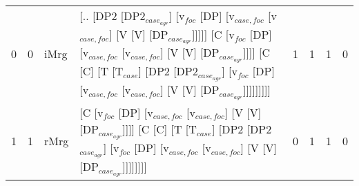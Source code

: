 \begin{tabularx}{\linewidth}{rrlXrrrr}
   0 &   0 & iMrg & [.. [DP2 [DP2$_{case_{agr}}$] [v$_{foc}$ [DP] [v$_{case,foc}$ [v$_{case,foc}$] [V [V] [DP$_{case_{agr}}$]]]]] [C [v$_{foc}$ [DP] [v$_{case,foc}$ [v$_{case,foc}$] [V [V] [DP$_{case_{agr}}$]]]] [C [C] [T [T$_{case}$] [DP2 [DP2$_{case_{agr}}$] [v$_{foc}$ [DP] [v$_{case,foc}$ [v$_{case,foc}$] [V [V] [DP$_{case_{agr}}$]]]]]]]]]              &             1 &             1 &             1 &                  0 \\
   1 &   1 & rMrg & [C [v$_{foc}$ [DP] [v$_{case,foc}$ [v$_{case,foc}$] [V [V] [DP$_{case_{agr}}$]]]] [C [C] [T [T$_{case}$] [DP2 [DP2$_{case_{agr}}$] [v$_{foc}$ [DP] [v$_{case,foc}$ [v$_{case,foc}$] [V [V] [DP$_{case_{agr}}$]]]]]]]]                                                                                                     &             0 &             1 &             1 &                  0 \\
\hline
\end{tabularx}\endgroup\\
